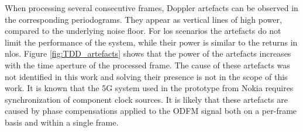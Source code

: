 		When processing several consecutive frames, Doppler artefacts can be observed in the corresponding periodograms.
		They appear as vertical lines of high power, compared to the underlying noise floor.
		For \gls{los} scenarios the artefacts do not limit the performance of the system, while their power is similar to the returns in \gls{nlos}.
		Figure \ref{fig:TDD_artefacts} shows that the power of the artefacts increases with the time aperture of the processed frame.
		The cause of these artefacts was not identified in this work and solving their presence is not in the scope of this work. It is known that the 5G system used in the prototype from Nokia requires synchronization of component clock sources.
		It is likely that these artefacts are caused by phase compensations applied to the ODFM signal both on a per-frame basis and within a single frame.
			\begin{figure}[H]
			\centering
			

\end{figure}
